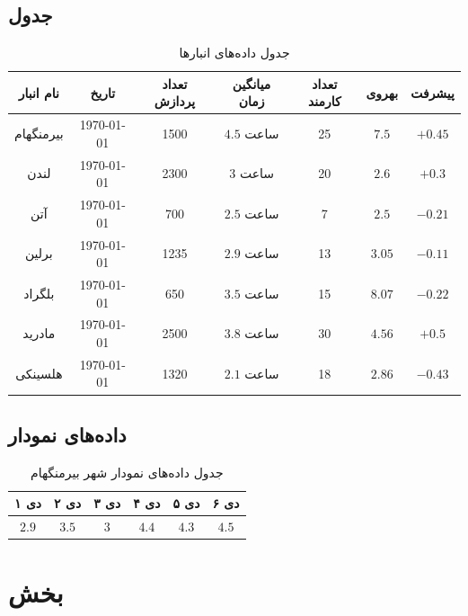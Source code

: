\documentclass[11pt, oneside]{book}
\begin{document}
\subsection{جدول}
\begin{table}[H]
\begin{center}
\caption{جدول داده‌های انبار‌ها}
\begin{adjustbox}{width=\textwidth}
\begin{tabular}{|c|c|c|c|c|c|c|}
\hline
نام انبار &
تاریخ &
تعداد پردازش &
میانگین زمان &
تعداد کارمند &
بهروی &
پیشرفت \\
\hline
\hline
بیرمنگهام &
\today &
1500 &
$4.5$ ساعت &
25 &
$7.5$ &
$+0.45$ \\
\hline
لندن &
\today &
2300 &
3 ساعت &
20 &
$2.6$ &
$+0.3$ \\
\hline
آتن &
\today &
700 &
$2.5$ ساعت &
7 &
$2.5$ &
$-0.21$ \\
\hline
برلین &
\today &
1235 &
$2.9$ ساعت &
13 &
$3.05$ &
$-0.11$ \\
\hline
بلگراد &
\today &
650 &
$3.5$ ساعت &
15 &
$8.07$ &
$-0.22$ \\
\hline
مادرید &
\today &
2500 &
$3.8$ ساعت &
30 &
$4.56$ &
$+0.5$ \\
\hline
هلسینکی &
\today &
1320 &
$2.1$ ساعت &
18 &
$2.86$ &
$-0.43$ \\
\hline
\end{tabular}
\end{adjustbox}
\end{center}
\end{table}

\subsection{داده‌های نمودار}
\begin{table}[H]
\begin{center}
\caption{جدول داده‌های نمودار شهر بیرمنگهام}
\begin{tabular}{|c|c|c|c|c|c|}
\hline
۱ دی  &
۲ دی  &
۳ دی  &
۴ دی  &
۵ دی  &
۶ دی  \\
\hline
\hline
$2.9$ &
$3.5$ &
$3$ &
$4.4$ &
$4.3$ &
$4.5$ \\
\hline
\end{tabular}
\end{center}
\end{table}

\section{بخش }
\end{document}

